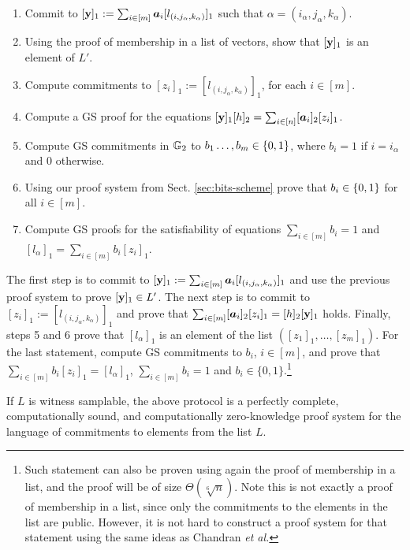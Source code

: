 \begin{enumerate}
\item Commit to $[\mathbf{y}]_1:=\sum_{i\in[m]}{\boldsymbol a}_i[l_{(i,j_\alpha,k_\alpha)}]_1$ such that $\alpha=(i_\alpha,j_\alpha,k_\alpha)$.
\item Using the  proof of membership in a list of vectors, show that $[\mathbf{y}]_1$ is an element of $L'$.
\item Compute commitments to $[z_i]_1:=[l_{(i,j_\alpha,k_\alpha)}]_1$, for each $i\in[m]$.
\item Compute a GS proof for the equations $[\mathbf{y}]_1[h]_2=\sum_{i\in[n]}[{\boldsymbol a}_i]_2 [z_i]_1$. 
\item Compute GS commitments in $\mathbb{G}_2$ to $b_1\ldots,b_m\in\{0,1\}$,
      where $b_i = 1$ if $i=i_\alpha$ and $0$ otherwise.
\item Using our proof system from Sect. \ref{sec:bits-scheme} prove that $b_i\in\{0,1\}$ for all $i\in[m]$.
\item Compute GS proofs for the satisfiability of equations $\sum_{i\in[m]}b_i=1$ and $[l_{\alpha}]_1=\sum_{i\in[m]}b_i[z_i]_1$.
\end{enumerate}

The first step is to commit to $[\mathbf{y}]_1:= \sum_{i\in[m]} {\boldsymbol a}_i [l_{(i,j_\alpha,k_\alpha)}]_1$ and use the previous proof system to prove $[\mathbf{y}]_1 \in L'$. The next step is to commit to $[z_i]_1:=[l_{(i,j_\alpha,k_\alpha)}]_1$ and prove that $\sum_{i\in[m]}[{\boldsymbol a}_i]_2[z_i]_1 = [h]_2[\mathbf{y}]_1$ holds. Finally, steps 5 and 6 prove that $[l_{\alpha}]_1$ is an element of the list $([z_1]_1,\ldots,[z_m]_1)$. For the last statement, compute GS commitments to $b_i$, $i \in [m]$, 
and prove that $\sum_{i\in[m]}b_i[z_i]_1=[l_{\alpha}]_1$, $\sum_{i\in[m]}b_i=1$ and $b_i \in \{0,1\}$.\footnote{Such statement can also be proven using again the proof of membership in a list, and the proof will be of size $\Theta(\sqrt[6]{n})$. Note this is not exactly a proof of membership in a list, since only the  commitments to the elements in the list are public. However, it is not hard to construct a proof system for that statement using the same ideas as Chandran \textit{et al.} }

\begin{theorem}
If $L$ is witness samplable, the above protocol is a perfectly complete, computationally sound, and computationally zero-knowledge proof system for the language of commitments to elements from the list $L$.
\end{theorem}

